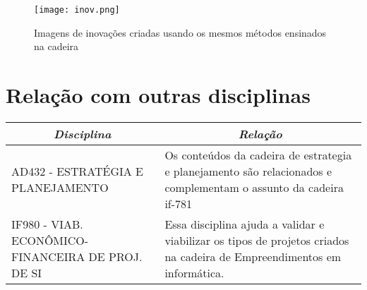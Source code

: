 \documentclass[10pt]{article}
\begin{document}
\begin{figure}[h!]
\centering
\texttt{[image: inov.png]}
\caption{Imagens de inovações criadas usando os mesmos métodos ensinados na cadeira \citep{imgs}}
\label{fig:inov}
\end{figure}

\section{Relação com outras disciplinas}

\begin{table}[htbp]
\centering
\begin{tabularx}{\linewidth}{|X|X|}
\hline
\multicolumn{1}{|c|}{\textit{\textbf{Disciplina}}} & \multicolumn{1}{c|}{\textit{\textbf{Relação}}}  \tabularnewline \hline
AD432 - ESTRATÉGIA E PLANEJAMENTO  & Os conteúdos da cadeira de estrategia e planejamento são relacionados e complementam o assunto da cadeira if-781  \tabularnewline \hline    
IF980 - VIAB. ECONÔMICO-FINANCEIRA DE PROJ. DE SI & Essa disciplina ajuda a validar e viabilizar os tipos de projetos criados na cadeira de Empreendimentos em informática.\tabularnewline \hline 
\end{tabularx}
\label{table:compa}   
\end{table}



\end{document}

